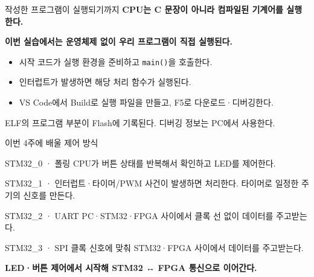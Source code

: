 \documentclass[aspectratio=43,11pt,t]{beamer}
\begin{document}
\begin{frame}{작성한 프로그램이 실행되기까지}
\fontsize{9}{12}\selectfont
\textbf{CPU는 C 문장이 아니라 컴파일된 기계어를 실행한다.}
\begin{center}
\end{center}
\fontsize{8.5}{11}\selectfont
\textbf{이번 실습에서는 운영체제 없이 우리 프로그램이 직접 실행된다.}
\begin{itemize}\setlength{\itemsep}{0.08cm}
\item 시작 코드가 실행 환경을 준비하고 \texttt{main()}을 호출한다.
\item 인터럽트가 발생하면 해당 처리 함수가 실행된다.
\item VS Code에서 Build로 실행 파일을 만들고, F5로 다운로드·디버깅한다.
\end{itemize}
\fontsize{7.5}{10}\selectfont
ELF의 프로그램 부분이 Flash에 기록된다. 디버깅 정보는 PC에서 사용한다.
\end{frame}

\begin{frame}{이번 4주에 배울 제어 방식}
\fontsize{8.5}{10.5}\selectfont
\begin{block}{STM32\_0 · 폴링}
\fontsize{8.5}{10.5}\selectfont
CPU가 버튼 상태를 반복해서 확인하고 LED를 제어한다.
\end{block}
\begin{block}{STM32\_1 · 인터럽트·타이머/PWM}
\fontsize{8.5}{10.5}\selectfont
사건이 발생하면 처리한다. 타이머로 일정한 주기의 신호를 만든다.
\end{block}
\begin{block}{STM32\_2 · UART}
\fontsize{8.5}{10.5}\selectfont
PC·STM32·FPGA 사이에서 클록 선 없이 데이터를 주고받는다.
\end{block}
\begin{block}{STM32\_3 · SPI}
\fontsize{8.5}{10.5}\selectfont
클록 신호에 맞춰 STM32·FPGA 사이에서 데이터를 주고받는다.
\end{block}
\vspace{0.02cm}
\textbf{LED·버튼 제어에서 시작해 STM32 ↔ FPGA 통신으로 이어간다.}
\end{frame}
\end{document}
